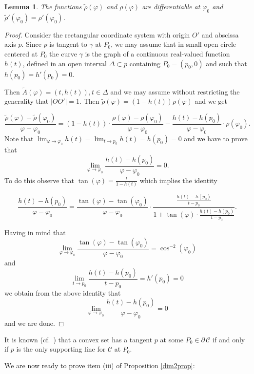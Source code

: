 \documentclass[a4paper,12pt]{amsart}
\newtheorem{lemma}[thm]{Lemma}
\begin{document}
\begin{lemma} \label{linearization}
The functions $\tilde{\rho}(\varphi)$ and $\rho(\varphi)$ are
differentiable at $\varphi_0$ and
$\tilde{\rho}'(\varphi_0)=\rho'(\varphi_0)$.
\end{lemma}
\begin{proof}
Consider the rectangular coordinate system with origin $O'$ and
abscissa axis $p$.  Since $p$ is tangent to $\gamma$ at $P_0$, we
may assume that in small open circle centered at $P_0$ the curve
$\gamma$ is the graph of a continuous  real-valued function
$h(t)$, defined in an open interval $\Delta \subset p$ containing
$P_0=(p_0,0)$ and such that $h(p_0)=h'(p_0)=0$.

Then $\tilde{A}(\varphi)=(t,h(t)), t\in \Delta$ and we may assume without restricting the generality that $|OO'|=1$.
Then
$\displaystyle\tilde{\rho}(\varphi)=(1-h(t))\rho(\varphi)$ and we
get

$$\frac{\tilde{\rho}(\varphi)-\tilde{\rho}(\varphi_0)}{\varphi-\varphi_0}=
(1-h(t))\cdot\frac{\rho(\varphi)-\rho(\varphi_0)}{\varphi-\varphi_0}
-\frac{h(t)-h(p_0)}{\varphi-\varphi_0}\cdot\rho(\varphi_0) .$$
Note that $\lim_{\varphi \rightarrow \varphi_0}h(t)=\lim_{t
\rightarrow p_0}h(t)= h(p_0)=0$ and we have to prove that
$$\lim_{\varphi \rightarrow
\varphi_0}\frac{h(t)-h(p_0)}{\varphi-\varphi_0}=0.$$ To do this
observe that $\displaystyle \tan(\varphi)=\frac{t}{1-h(t)}$ which
implies the identity

$$\frac{h(t)-h(p_0)}{\varphi-\varphi_0}=\frac{\tan(\varphi)-\tan(\varphi_0)}{\varphi-\varphi_0}
\cdot\displaystyle
\frac{\displaystyle\frac{h(t)-h(p_0)}{t-p_0}}{1+\tan(\varphi)\cdot\displaystyle\frac{h(t)-h(p_0)}{t-p_0}}.$$

Having in mind that $$\lim_{\varphi
\rightarrow\varphi_0}\frac{\tan(\varphi)-\tan(\varphi_0)}{\varphi-\varphi_0}=\cos^{-2}(\varphi_0)
$$ and   $$\lim_{t \rightarrow
p_0}\frac{h(t)-h(p_0)}{t-p_0}=h'(p_0)=0$$ we obtain from the above
identity that
$$\lim_{\varphi \rightarrow
\varphi_0}\frac{h(t)-h(p_0)}{\varphi-\varphi_0}=0$$ and we are
done.
\end{proof}

\medskip

It is known (cf.~\cite[Theorem 25.1]{Rock}) that a convex set has a tangent $p$ at some $P_0 \in \partial\, \mathcal{C}$ if and only if $p$ is the only supporting line for $\mathcal{C} $ at $P_0$.

We are now ready to prove item (iii) of Proposition
\ref{dim2prop}:
\end{document}
